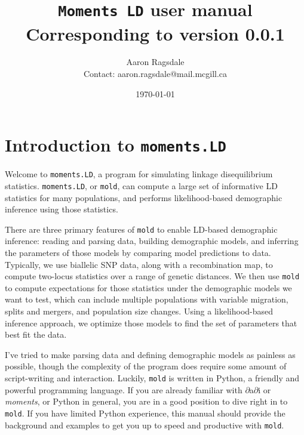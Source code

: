 \documentclass[10pt]{article}
\newcommand{\dadi}{$\partial$a$\partial$i\xspace}
\newcommand{\comment}[1]{{\color{blue}APR: #1}}
\newcommand{\mold}{\texttt{mold}\xspace}
\begin{document}
\title{\texttt{Moments LD} user manual\\
\normalsize  Corresponding to version 0.0.1}
\author{Aaron Ragsdale \\
Contact: aaron.ragsdale@mail.mcgill.ca}
\date{\today}
\maketitle


\tableofcontents

\clearpage

\lstlistoflistings

\clearpage

\section{Introduction to \texttt{moments.LD}}

Welcome to \texttt{moments.LD}, a program for simulating linkage disequilibrium statistics.
\texttt{moments.LD}, or \mold, can compute a large set of informative LD statistics for many populations, and performs likelihood-based demographic inference using those statistics.

There are three primary features of \mold to enable LD-based demographic inference: reading and parsing data, building demographic models, and inferring the parameters of those models by comparing model predictions to data.
Typically, we use biallelic SNP data, along with a recombination map, to compute two-locus statistics over a range of genetic distances.
We then use \mold to compute expectations for those statistics under the demographic models we want to test, which can include multiple populations with variable migration, splits and mergers, and population size changes.
Using a likelihood-based inference approach, we optimize those models to find the set of parameters that best fit the data.

I've tried to make parsing data and defining demographic models as painless as possible, though the complexity of the program does require some amount of script-writing and interaction.
Luckily, \mold is written in Python, a friendly and powerful programming language.
If you are already familiar with \dadi or \emph{moments}, or Python in general, you are in a good position to dive right in to \mold.
If you have limited Python experience, this manual should provide the background and examples to get you up to speed and productive with \mold.

\end{document}
